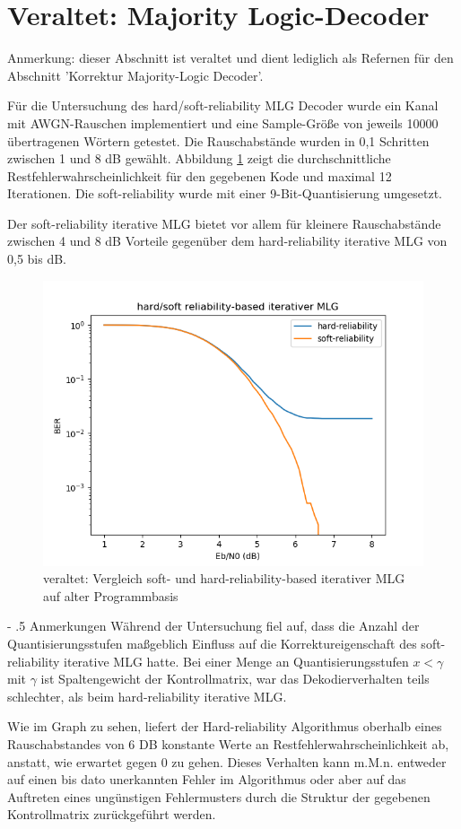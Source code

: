 \documentclass[11pt,a4paper]{article}
\makeatletter
\renewcommand\paragraph{%
\@startsection{paragraph}{4}{0mm}%
{-\baselineskip}%
{.5\baselineskip}%
{\normalfont\normalsize\bfseries}}
\makeatother
\begin{document}
\section{Veraltet: Majority Logic-Decoder}

Anmerkung: dieser Abschnitt ist veraltet und dient lediglich als Refernen für den Abschnitt 'Korrektur Majority-Logic Decoder'.

Für die Untersuchung des hard/soft-reliability MLG Decoder wurde ein Kanal mit AWGN-Rauschen implementiert und eine Sample-Größe von jeweils 10000 übertragenen Wörtern getestet.
Die Rauschabstände wurden in 0,1 Schritten zwischen 1 und 8 dB gewählt. Abbildung \ref{fig:plot} zeigt die durchschnittliche Restfehlerwahrscheinlichkeit für den gegebenen Kode und maximal 12 Iterationen. Die soft-reliability wurde mit einer 9-Bit-Quantisierung umgesetzt. 

Der soft-reliability iterative MLG bietet vor allem für kleinere Rauschabstände zwischen 4 und 8 dB Vorteile gegenüber dem hard-reliability iterative MLG von 0,5 bis dB. 

\begin{figure}[hb]
	\includegraphics[width=\linewidth]{foo.png}
	\caption{veraltet: Vergleich soft- und hard-reliability-based iterativer MLG auf alter Programmbasis}
	\label{fig:plot}
\end{figure}


\paragraph{Anmerkungen} Während der Untersuchung fiel auf, dass die Anzahl der Quantisierungsstufen maßgeblich Einfluss auf die Korrektureigenschaft des soft-reliability iterative MLG hatte. Bei einer Menge an Quantisierungsstufen $x < \gamma $ mit $\gamma$ ist Spaltengewicht der Kontrollmatrix, war das Dekodierverhalten teils schlechter, als beim hard-reliability iterative MLG.

Wie im Graph zu sehen, liefert der Hard-reliability Algorithmus oberhalb eines Rauschabstandes von 6 DB konstante Werte an Restfehlerwahrscheinlichkeit ab, anstatt, wie erwartet gegen 0 zu gehen. Dieses Verhalten kann m.M.n. entweder auf einen bis dato unerkannten Fehler im Algorithmus oder aber auf das Auftreten eines ungünstigen Fehlermusters durch die Struktur der gegebenen Kontrollmatrix zurückgeführt werden. 
\end{document}
